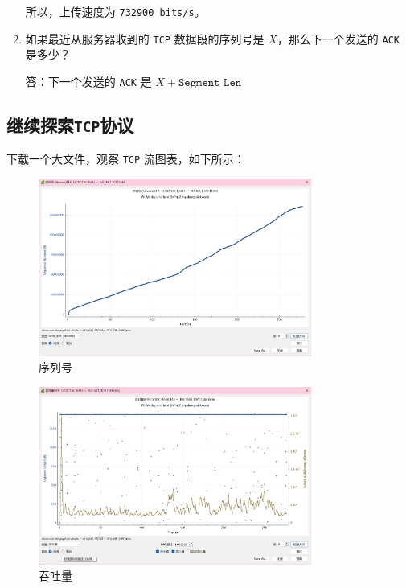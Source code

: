 \documentclass{article}
\begin{document}
\begin{enumerate}
	所以，上传速度为 \texttt{732900 \texttt{bits/s}}。
	
	\item 如果最近从服务器收到的 \texttt{TCP} 数据段的序列号是 $X$，那么下一个发送的 \texttt{ACK} 是多少？
	
	答：下一个发送的 \texttt{ACK} 是 $X + \texttt{Segment Len}$
\end{enumerate}

\subsection{继续探索\texttt{TCP}协议}

下载一个大文件，观察 \texttt{TCP} 流图表，如下所示：

\begin{figure}[H]
  \centering
  \includegraphics[width=0.8\textwidth]{img/11.png}
  \caption{序列号}
\end{figure}

\begin{figure}[H]
  \centering
  \includegraphics[width=0.8\textwidth]{img/12.png}
  \caption{吞吐量}
\end{figure}
\end{document}
